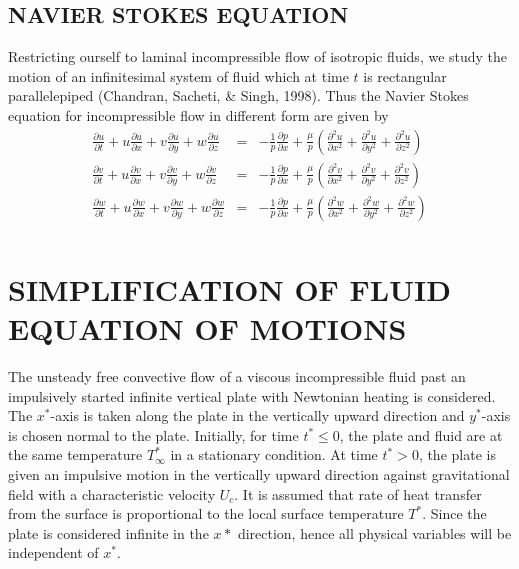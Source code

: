 \documentclass[11pt]{report}
\newcommand{\sps}{\\[0.2cm]}
\begin{document}
	\subsection{NAVIER STOKES EQUATION}
	Restricting ourself to laminal incompressible flow of isotropic fluids, we study the motion of an infinitesimal system of fluid which at time $t$ is rectangular parallelepiped (Chandran, Sacheti, \& Singh, 1998). Thus the Navier Stokes equation for incompressible flow in different form are given by
	\begin{eqnarray*}
			\frac{\partial u}{\partial t} + u\frac{\partial u}{\partial x} + v\frac{\partial u}{\partial y} + w\frac{\partial u}{\partial z} &=& - \frac{1}{p}\frac{\partial p}{\partial x} + \frac{\mu}{p}\left(\frac{\partial^2 u}{\partial x^2}+\frac{\partial^2 u}{\partial y^2} + \frac{\partial^2 u}{\partial z^2}\right)\sps
			\frac{\partial v}{\partial t} + u\frac{\partial v}{\partial x} + v\frac{\partial v}{\partial y} + w\frac{\partial v}{\partial z} &=& - \frac{1}{p}\frac{\partial p}{\partial x} + \frac{\mu}{p}\left(\frac{\partial^2 v}{\partial x^2}+\frac{\partial^2 v}{\partial y^2} + \frac{\partial^2 v}{\partial z^2}\right)\sps
			\frac{\partial w}{\partial t} + u\frac{\partial w}{\partial x} + v\frac{\partial w}{\partial y} + w\frac{\partial w}{\partial z} &=& - \frac{1}{p}\frac{\partial p}{\partial x} + \frac{\mu}{p}\left(\frac{\partial^2 w}{\partial x^2}+\frac{\partial^2 w}{\partial y^2} + \frac{\partial^2 w}{\partial z^2}\right)\sps
	\end{eqnarray*}
	
	\section{SIMPLIFICATION OF FLUID EQUATION OF MOTIONS}
	The unsteady free convective flow of a viscous incompressible fluid past an impulsively started infinite vertical plate with Newtonian heating is considered. The $x^*$-axis is taken along the plate in the vertically upward direction and $y^*$-axis is chosen normal to the plate. Initially, for time $t^* \leq 0$, the plate and fluid are at the same temperature $T^*_\infty$ in a stationary condition. At time $t^* > 0$, the plate is given an impulsive motion in the vertically upward direction against gravitational field with a characteristic velocity $U_c$. It is assumed that rate of heat transfer from the surface is proportional to the local surface temperature $T^*$. Since the plate is considered infinite in the $x*$ direction, hence all physical variables will be independent of $x^*$. 
	
\end{document}

